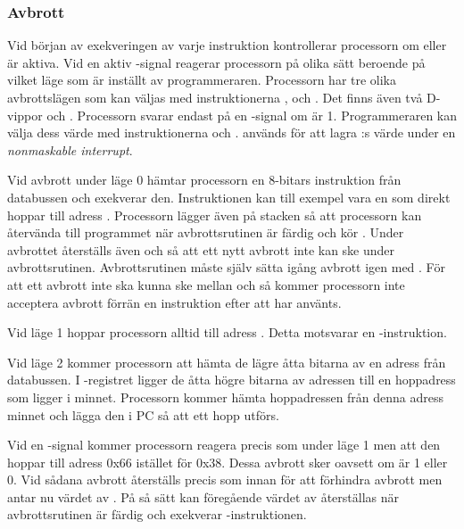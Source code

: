\documentclass[main.tex]{subfiles}
\begin{document}
\subsubsection{Avbrott}
Vid början av exekveringen av varje instruktion kontrollerar processorn om
 eller  är aktiva. Vid en aktiv -signal reagerar
processorn på olika sätt beroende på vilket läge som är inställt av
programmeraren. Processorn har tre olika avbrottslägen som kan väljas med
instruktionerna ,  och . Det finns även två
D-vippor  och . Processorn svarar endast på en
-signal om  är 1. Programmeraren kan välja dess värde med
instruktionerna  och .  används för att lagra
:s värde under en {\it nonmaskable interrupt}.

Vid avbrott under läge 0 hämtar processorn en 8-bitars instruktion från
databussen och exekverar den. Instruktionen kan till exempel vara en  som direkt hoppar till adress . Processorn lägger även
 på stacken så att processorn kan återvända till programmet när
avbrottsrutinen är färdig och kör . Under avbrottet återställs även
 och  så att ett nytt avbrott inte kan ske under
avbrottsrutinen. Avbrottsrutinen måste själv sätta igång avbrott igen med
. För att ett avbrott inte ska kunna ske mellan  och
 så kommer processorn inte acceptera avbrott förrän en instruktion
efter att  har använts.

Vid läge 1 hoppar processorn alltid till adress . Detta motsvarar
en -instruktion.

Vid läge 2 kommer processorn att hämta de lägre åtta bitarna av en adress från
databussen. I -registret ligger de åtta högre bitarna av adressen till
en hoppadress som ligger i minnet. Processorn kommer hämta hoppadressen från
denna adress minnet och lägga den i PC så att ett hopp utförs.

Vid en -signal kommer processorn reagera precis som under läge 1 men
att den hoppar till adress 0x66 istället för 0x38. Dessa avbrott sker oavsett
om  är 1 eller 0. Vid sådana avbrott återställs  precis
som innan för att förhindra avbrott men  antar nu värdet av
. På så sätt kan föregående värdet av  återställas när
avbrottsrutinen är färdig och exekverar -instruktionen.
\end{document}
